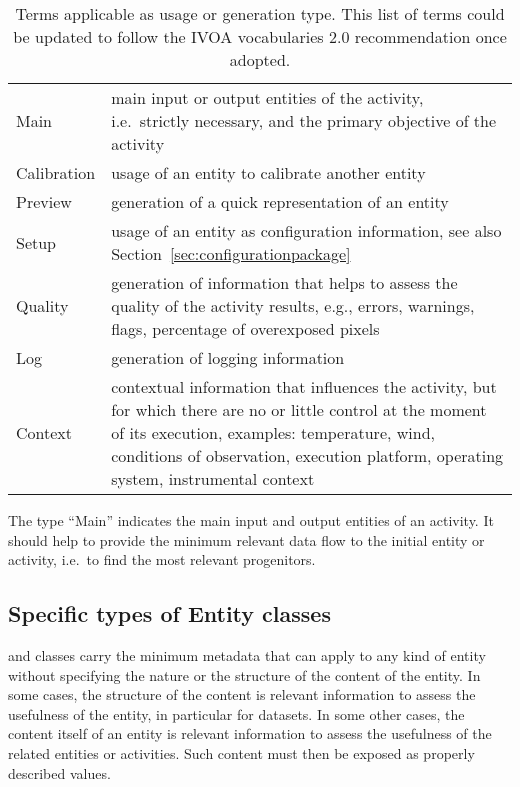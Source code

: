 \begin{table}[ht]
\small
{}\textwidth
\begin{tabulary}{1.0\textwidth}{Lp{8cm}}
\toprule
{} &  \\
\midrule
Main           & main input or output entities of the activity, i.e.~strictly necessary, and the primary objective of the activity\\
Calibration    & usage of an entity to calibrate another entity\\
Preview        & generation of a quick representation of an entity\\
Setup          & usage of an entity as configuration information, see also Section~\ref{sec:configurationpackage}\\
Quality        & generation of information that helps to assess the quality of the activity results, e.g., errors, warnings, flags, percentage of overexposed pixels\\
Log            & generation of logging information\\
Context        & contextual information that influences the activity, but for which there are no or little control at the moment of its execution, examples: temperature, wind, conditions of observation, execution platform, operating system, instrumental context\\
\bottomrule
\end{tabulary}
\caption[Terms applicable as usage or generation type.]{Terms applicable as usage or generation type. This list of terms could be updated to follow the IVOA vocabularies 2.0 recommendation once adopted.}
\label{tab:usage-generation-types}
\end{table}

The type ``Main'' indicates the main input and output entities of an activity. It should help to provide the minimum relevant data flow to the initial entity or activity, i.e.~to find the most relevant progenitors.


\subsection{Specific types of Entity classes}
\label{sec:spec_entities}

 and  classes carry the minimum metadata that can apply to any kind of entity without specifying the nature or the structure of the content of the entity. 
In some cases, the structure of the content is relevant information to assess the usefulness of the entity, in particular for datasets.
In some other cases, the content itself of an entity is relevant information to assess the usefulness of the related entities or activities. Such content must then be exposed as properly described values.

